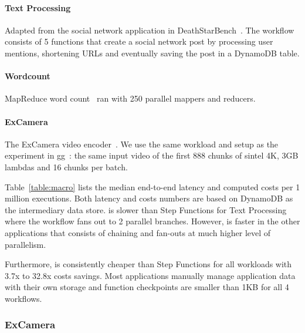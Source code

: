 \paragraph{Text Processing} Adapted from the social network application in
DeathStarBench~\cite{deathstar}. The workflow consists of 5 functions that
create a social network post by processing user mentions, shortening URLs and
eventually saving the post in a DynamoDB table.

\paragraph{Wordcount} MapReduce word count~\cite{mapreduce} ran with 250
parallel mappers and reducers.

\paragraph{ExCamera} The ExCamera video encoder~\cite{excamera, gg-atc}. We
use the same workload and setup as the experiment in gg~\cite{gg-atc}: the same
input video of the first 888 chunks of sintel 4K, 3GB lambdas and 16 chunks
per batch.

Table~\ref{table:macro} lists the median end-to-end latency and computed costs
per 1 million executions. Both latency and costs numbers are based on DynamoDB
as the intermediary data store. \name{} is slower than Step Functions for Text
Processing where the workflow fans out to 2 parallel branches.  However,
\name{} is faster in the other applications that consists of chaining and
fan-outs at much higher level of parallelism.

Furthermore, \name{} is consistently cheaper than Step Functions for all
workloads with 3.7x to 32.8x costs savings. Most applications manually manage
application data with their own storage and function checkpoints are smaller
than 1KB for all 4 workflows.

\subsubsection{ExCamera}\label{sec:eval-excamera}

